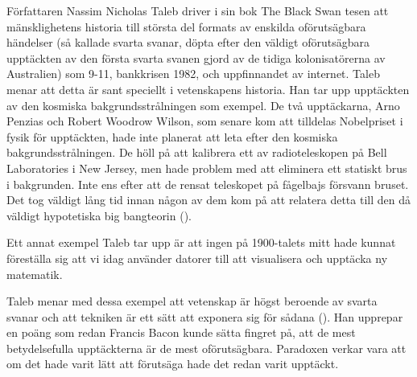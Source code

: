 Författaren Nassim Nicholas Taleb driver i sin bok The Black Swan tesen att mänsklighetens historia till största del formats av enskilda oförutsägbara händelser (så kallade svarta svanar, döpta efter den väldigt oförutsägbara upptäckten av den första svarta svanen gjord av de tidiga kolonisatörerna av Australien) som 9-11, bankkrisen 1982, och uppfinnandet av internet. Taleb menar att detta är sant speciellt i vetenskapens historia. Han tar upp upptäckten av den kosmiska bakgrundsstrålningen som exempel. De två upptäckarna, Arno Penzias och Robert Woodrow Wilson, som senare kom att tilldelas Nobelpriset i fysik för upptäckten, hade inte planerat att leta efter den kosmiska bakgrundsstrålningen. De höll på att kalibrera ett av radioteleskopen på Bell Laboratories i New Jersey, men hade problem med att eliminera ett statiskt brus i bakgrunden. Inte ens efter att de rensat teleskopet på fågelbajs försvann bruset. Det tog väldigt lång tid innan någon av dem kom på att relatera detta till den då väldigt hypotetiska big bangteorin (\cite[kap.\ 11]{Taleb2007}).

Ett annat exempel Taleb tar upp är att ingen på 1900-talets mitt hade kunnat föreställa sig att vi idag använder datorer till att visualisera och upptäcka ny matematik.

Taleb menar med dessa exempel att vetenskap är högst beroende av svarta svanar och att tekniken är ett sätt att exponera sig för sådana (\cite[kap.\ 11]{Taleb2007}). Han upprepar en poäng som redan Francis Bacon kunde sätta fingret på, att de mest betydelsefulla upptäckterna är de mest oförutsägbara. Paradoxen verkar vara att om det hade varit lätt att förutsäga hade det redan varit upptäckt.


%

\bigskip

